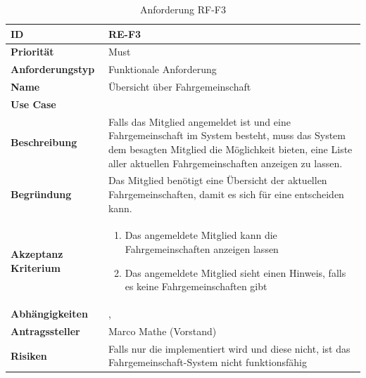 \begin{table}[ht]
\centering
  \begin{tabular}{ l | p{8cm} }
	\hline
	\rowcolor{gray}
	\textbf{ID} 			&	\textbf{RE-F3}\\ \hline
	\textbf{Priorität} 		&	Must\\ \hline
	\textbf{Anforderungstyp}	&	Funktionale Anforderung\\ \hline
	\textbf{Name} 			&	Übersicht über Fahrgemeinschaft\\ \hline
	\textbf{Use Case} 		&	\nameref{table:use_case_2}\\ \hline
	\textbf{Beschreibung} 	&	Falls das Mitglied angemeldet ist und eine Fahrgemeinschaft im System besteht, muss das System dem besagten Mitglied die Möglichkeit bieten, eine Liste aller aktuellen Fahrgemeinschaften anzeigen zu lassen.\\ \hline
	\textbf{Begründung} 		&	Das Mitglied benötigt eine Übersicht der aktuellen Fahrgemeinschaften, damit es sich für eine entscheiden kann.\\ \hline
	\textbf{Akzeptanz Kriterium}	&	\begin{enumerate}
					\item Das angemeldete Mitglied kann die Fahrgemeinschaften anzeigen lassen
					\item Das angemeldete Mitglied sieht einen Hinweis, falls es keine Fahrgemeinschaften gibt
					\end{enumerate}
					\\ \hline
	\textbf{Abhängigkeiten} 	&	\nameref{table:req_1}, \nameref{table:req_2}\\ \hline
	\textbf{Antragssteller} 	&	Marco Mathe (Vorstand)\\ \hline
	\textbf{Risiken}	 	&	Falls nur die \nameref{table:req_2} implementiert wird und diese nicht, ist das Fahrgemeinschaft-System nicht funktionsfähig
  \end{tabular}
   \caption{Anforderung RF-F3}\label{table:req_3}
\end{table}

